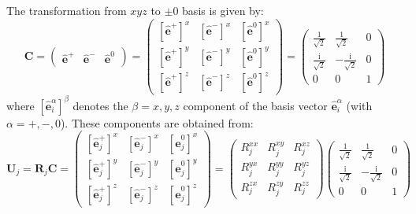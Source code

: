 \documentclass[aps, prx, nofootinbib, superscriptaddress]{revtex4-2}
\newcommand{\ri}{\mathrm{i}}
\begin{document}
The transformation from $xyz$ to $\pm0$ basis is given by:
\begin{equation}
    \mathbf{C} = 
    \begin{pmatrix}
        \hat{\mathbf{e}}^{+} & \hat{\mathbf{e}}^{-} & \hat{\mathbf{e}}^{0}
    \end{pmatrix}
    = 
    \begin{pmatrix}
        [\hat{\mathbf{e}}^{+}]^{x} & [\hat{\mathbf{e}}^{-}]^{x} & [\hat{\mathbf{e}}^{0}]^{x} \\[0.1em]
        [\hat{\mathbf{e}}^{+}]^{y} & [\hat{\mathbf{e}}^{-}]^{y} & [\hat{\mathbf{e}}^{0}]^{y} \\[0.1em]
        [\hat{\mathbf{e}}^{+}]^{z} & [\hat{\mathbf{e}}^{-}]^{z} & [\hat{\mathbf{e}}^{0}]^{z} 
    \end{pmatrix}
    = 
    \begin{pmatrix}
        \frac{1}{\sqrt{2}}  &   \frac{1}{\sqrt{2}}  &   0   \\[0.1em]
        \frac{\ri}{\sqrt{2}}  & - \frac{\ri}{\sqrt{2}}  &   0   \\[0.1em]
                    0       &           0           &   1   
    \end{pmatrix} 
\end{equation}
where $[\hat{\mathbf{e}}_{i}^{\alpha}]^{\beta}$ denotes the $\beta = x, y, z$ component of the basis vector $\hat{\mathbf{e}}_{i}^{\alpha}$ (with $\alpha = +, -, 0$). 
These components are obtained from:
\begin{equation}
    \mathbf{U}_{j} = \mathbf{R}_{j} \mathbf{C} =
    \begin{pmatrix}
        [\hat{\mathbf{e}}_{j}^{+}]^{x} & [\hat{\mathbf{e}}_{j}^{-}]^{x} & [\hat{\mathbf{e}}_{j}^{0}]^{x} \\[0.25em]
        [\hat{\mathbf{e}}_{j}^{+}]^{y} & [\hat{\mathbf{e}}_{j}^{-}]^{y} & [\hat{\mathbf{e}}_{j}^{0}]^{y} \\[0.25em]
        [\hat{\mathbf{e}}_{j}^{+}]^{z} & [\hat{\mathbf{e}}_{j}^{-}]^{z} & [\hat{\mathbf{e}}_{j}^{0}]^{z} 
    \end{pmatrix}
    = 
    \begin{pmatrix}
        R^{xx}_{j}   &   R^{xy}_{j}   &   R^{xz}_{j}   \\[0.25em]
        R^{yx}_{j}   &   R^{yy}_{j}   &   R^{yz}_{j}   \\[0.25em]
        R^{zx}_{j}   &   R^{zy}_{j}   &   R^{zz}_{j}   
    \end{pmatrix}
    \begin{pmatrix}
        \frac{1}{\sqrt{2}}   &   \frac{1}{\sqrt{2}}   &   0   \\[0.25em]
        \frac{\ri}{\sqrt{2}}   & - \frac{\ri}{\sqrt{2}}   &   0   \\[0.25em]
                0     &         0       &   1   
    \end{pmatrix} 
\end{equation}
\end{document}
